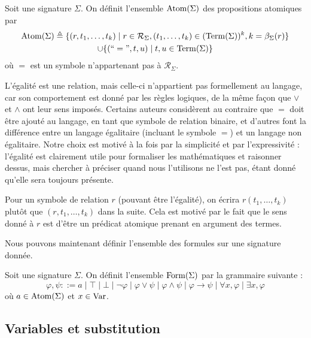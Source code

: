 \begin{definition}
  Soit une signature $\Sigma$. On définit l'ensemble $\operatorname{Atom}(\Sigma)$ des
  propositions atomiques par
  \begin{multline*}
    \operatorname{Atom}(\Sigma) \triangleq \{(r,t_1,\ldots,t_k)\mid r\in\mathcal R_\Sigma,
    (t_1,\ldots,t_k) \in (\operatorname{Term}(\Sigma))^k, k = \beta_\Sigma(r)\}\\
    \cup\{(``=",t,u)\mid t,u\in \operatorname{Term}(\Sigma)\}
  \end{multline*}
  où $=$ est un symbole n'appartenant pas à $\mathcal R_\Sigma$.
\end{definition}

\begin{remark}
  L'égalité est une relation, mais celle-ci n'appartient pas formellement au
  langage, car son comportement est donné par les règles logiques, de la même
  façon que $\lor$ et $\land$ ont leur sens imposés. Certains auteurs
  considèrent au contraire que $=$ doit être ajouté au langage, en tant que
  symbole de relation binaire, et d'autres font la différence entre un langage
  égalitaire (incluant le symbole $=$) et un langage non égalitaire. Notre choix
  est motivé à la fois par la simplicité et par l'expressivité : l'égalité est
  clairement utile pour formaliser les mathématiques et raisonner dessus, mais
  chercher à préciser quand nous l'utilisons ne l'est pas, étant donné qu'elle
  sera toujours présente.
\end{remark}

\begin{notation}
  Pour un symbole de relation $r$ (pouvant être l'égalité), on écrira
  $r(t_1,\ldots,t_k)$ plutôt que $(r,t_1,\ldots,t_k)$ dans la suite. Cela est
  motivé par le fait que le sens donné à $r$ est d'être un prédicat atomique
  prenant en argument des termes.
\end{notation}

Nous pouvons maintenant définir l'ensemble des formules sur une signature
donnée.

\begin{definition}[Formules]
  Soit une signature $\Sigma$. On définit l'ensemble $\operatorname{Form}(\Sigma)$ par
  la grammaire suivante :
  \[\varphi,\psi ::= a\mid \top\mid\bot\mid\lnot\varphi\mid\varphi\lor\psi\mid
  \varphi\land\psi\mid \varphi\to\psi\mid\forall x,\varphi\mid
  \exists x,\varphi\]
  où $a\in \operatorname{Atom}(\Sigma)$ et $x\in \operatorname{Var}$.
\end{definition}

\subsection{Variables et substitution}

